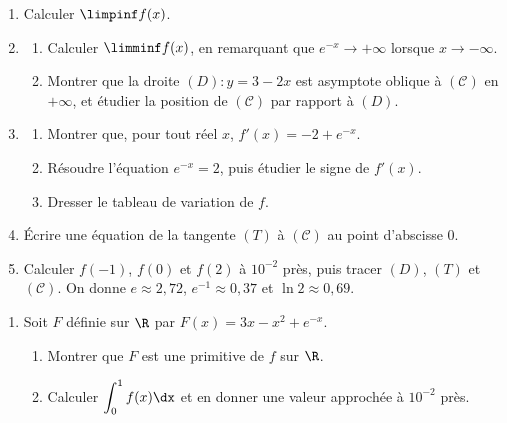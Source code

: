 \begin{devoirsurveille}
\begin{enumerate}[label=\textbf{\arabic*.}, leftmargin=*, itemsep=0.25em]
  \item Calculer $\limpinf f(x)$. 
  \item \begin{enumerate}[label=\textbf{\alph*)}, leftmargin=1.4em, itemsep=0.15em]
      \item Calculer $\limminf f(x)$, en remarquant que
            $e^{-x} \to +\infty$ lorsque $x \to -\infty$. 
      \item Montrer que la droite $(D) : y = 3-2x$ est asymptote oblique à
            $(\mathcal C)$ en $+\infty$, et étudier la position de
            $(\mathcal C)$ par rapport à $(D)$. 
    \end{enumerate}
  \item \begin{enumerate}[label=\textbf{\alph*)}, leftmargin=1.4em, itemsep=0.15em]
      \item Montrer que, pour tout réel $x$, $f'(x) = -2+e^{-x}$.
      \item Résoudre l'équation $e^{-x} = 2$, puis étudier le signe de
            $f'(x)$. 
      \item Dresser le tableau de variation de $f$. 
    \end{enumerate}
  \item Écrire une équation de la tangente $(T)$ à $(\mathcal C)$ au point
        d'abscisse $0$. 
  \item Calculer $f(-1)$, $f(0)$ et $f(2)$ à $10^{-2}$ près, puis tracer
        $(D)$, $(T)$ et $(\mathcal C)$. On donne $e \approx 2{,}72$,
        $e^{-1} \approx 0{,}37$ et $\ln 2 \approx 0{,}69$.
\end{enumerate}

\begin{enumerate}[label=\textbf{\arabic*.}, leftmargin=*, itemsep=0.25em, start=6]
  \item Soit $F$ définie sur $\R$ par $F(x) = 3x-x^{2}+e^{-x}$.
    \begin{enumerate}[label=\textbf{\alph*)}, leftmargin=1.4em, itemsep=0.15em]
      \item Montrer que $F$ est une primitive de $f$ sur $\R$.
      \item Calculer $\displaystyle\int_{0}^{1} f(x)\dx$ et en donner une
            valeur approchée à $10^{-2}$ près. 
    \end{enumerate}
\end{enumerate}
\end{devoirsurveille}


